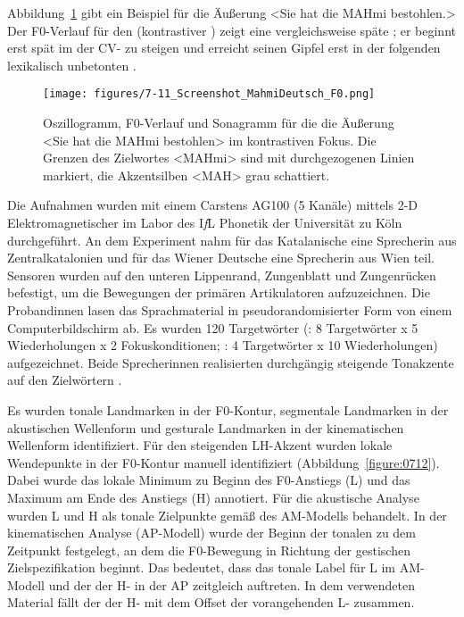 Abbildung~\ref{figure:0711} gibt ein Beispiel für die Äußerung <Sie hat die MAHmi bestohlen.> Der F0-Verlauf für den  (kontrastiver ) zeigt eine vergleichsweise späte ; er beginnt erst spät im  der CV- zu steigen und erreicht seinen Gipfel erst in der folgenden lexikalisch unbetonten .

\begin{figure}
	\texttt{[image: figures/7-11\_Screenshot\_MahmiDeutsch\_F0.png]}
	\caption{Oszillogramm, F0-Verlauf und Sonagramm für die die Äußerung <Sie hat die MAHmi bestohlen> im kontrastiven Fokus. Die Grenzen des Zielwortes <MAHmi> sind mit durchgezogenen Linien markiert, die Akzentsilben <MAH> grau schattiert.}
	\label{figure:0711}
\end{figure}

Die Aufnahmen wurden mit einem Carstens AG100 (5 Kanäle) mittels 2-D Elektromagnetischer  im Labor des I\textit{f}L Phonetik der Universität zu Köln durchgeführt. An dem Experiment nahm für das Katalanische eine Sprecherin aus Zentralkatalonien und für das Wiener Deutsche eine Sprecherin aus Wien teil. Sensoren wurden auf den unteren Lippenrand, Zungenblatt und Zungenrücken befestigt, um die Bewegungen der primären Artikulatoren aufzuzeichnen. Die Probandinnen lasen das Sprachmaterial in pseudorandomisierter Form von einem Computerbildschirm ab. Es wurden 120 Targetwörter (: 8 Targetwörter x 5 Wiederholungen x 2 Fokuskonditionen; : 4 Targetwörter x 10 Wiederholungen) aufgezeichnet. Beide Sprecherinnen realisierten durchgängig  steigende Tonakzente auf den Zielwörtern \citep[vgl. auch][]{Mücke2012}.

Es wurden tonale Landmarken in der F0-Kontur, segmentale Landmarken in der akustischen Wellenform und gesturale Landmarken in der kinematischen Wellenform identifiziert. Für den steigenden LH-Akzent wurden lokale Wendepunkte in der F0-Kontur manuell identifiziert (Abbildung~\ref{figure:0712}). Dabei wurde das lokale Minimum zu Beginn des F0-Anstiegs (L) und das Maximum am Ende des Anstiegs (H) annotiert. Für die akustische Analyse wurden L und H als tonale Zielpunkte gemäß des AM-Modells behandelt. In der kinematischen Analyse (AP-Modell) wurde der Beginn der tonalen  zu dem Zeitpunkt festgelegt, an dem die F0-Bewegung in Richtung der gestischen Zielspezifikation beginnt. Das bedeutet, dass das tonale Label für L im AM-Modell und der  der H- in der AP zeitgleich auftreten. In dem verwendeten Material fällt der  der H- mit dem Offset der vorangehenden L- zusammen.

